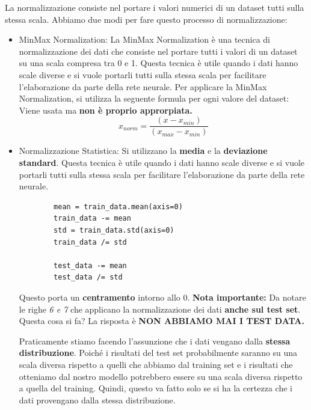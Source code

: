 La normalizzazione consiste nel portare i valori numerici di un dataset tutti
sulla stessa scala. Abbiamo due modi per fare questo processo di
normalizzazione:
\begin{itemize}
    \item MinMax Normalization: La MinMax Normalization è una tecnica di normalizzazione
          dei dati che consiste nel portare tutti i valori di un dataset su una scala
          compresa tra 0 e 1. Questa tecnica è utile quando i dati hanno scale diverse e
          si vuole portarli tutti sulla stessa scala per facilitare l'elaborazione da
          parte della rete neurale. Per applicare la MinMax Normalization, si utilizza la
          seguente formula per ogni valore del dataset: Viene usata ma \textbf{non è
              proprio approrpiata.}
          \begin{equation}
              x_{norm} = \frac{(x - x_{min})}{(x_{max} - x_{min})}
          \end{equation}
    \item Normalizzazione Statistica: Si utilizzano la \textbf{media} e la
          \textbf{deviazione standard}. Questa tecnica è utile quando i dati hanno scale
          diverse e si vuole portarli tutti sulla stessa scala per facilitare
          l'elaborazione da parte della rete neurale.
          \begin{lstlisting}
        mean = train_data.mean(axis=0)
        train_data -= mean
        std = train_data.std(axis=0)
        train_data /= std

        test_data -= mean
        test_data /= std
    \end{lstlisting}
          Questo porta un \textbf{centramento} intorno allo 0. \textbf{Nota importante:}
          Da notare le righe \textit{6 e 7} che applicano la normalizzazione dei dati
          \textbf{anche sul test set}. Questa cosa si fa? La risposta è \textbf{NON
              ABBIAMO MAI I TEST DATA.}

          Praticamente stiamo facendo l'assunzione che i dati vengano dalla
          \textbf{stessa distribuzione}. Poiché i risultati del test set probabilmente
          saranno su una scala diversa rispetto a quelli che abbiamo dal training set e i
          risultati che otteniamo dal nostro modello potrebbero essere su una scala diversa
          rispetto a quella del training. Quindi, questo va fatto solo se si ha la certezza
            che i dati provengano dalla stessa distribuzione.
\end{itemize}

